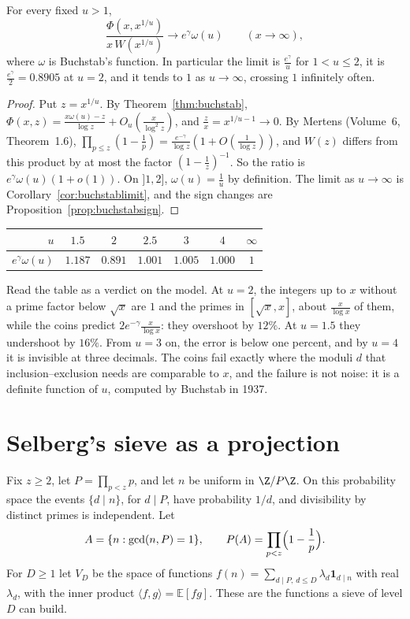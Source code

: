 \begin{proposition}\label{prop:sievefail}
For every fixed $u>1$,
\[
\frac{\Phi(x,x^{1/u})}{x\,W(x^{1/u})}\longrightarrow e^\gamma\omega(u)\qquad(x\to\infty),
\]
where $\omega$ is Buchstab's function. In particular the limit is $\frac{e^\gamma}u$ for $1<u\le2$, it is $\frac{e^\gamma}2=0.8905$ at $u=2$, and it tends to $1$ as $u\to\infty$, crossing $1$ infinitely often.
\end{proposition}
\begin{proof}
Put $z=x^{1/u}$. By Theorem~\ref{thm:buchstab}, $\Phi(x,z)=\frac{x\omega(u)-z}{\log z}+O_u(\frac x{\log^2z})$, and $\frac zx=x^{1/u-1}\to0$. By Mertens (Volume~6, Theorem~1.6), $\prod_{p\le z}(1-\frac1p)=\frac{e^{-\gamma}}{\log z}(1+O(\frac1{\log z}))$, and $W(z)$ differs from this product by at most the factor $(1-\frac1z)^{-1}$. So the ratio is $e^\gamma\omega(u)(1+o(1))$. On $]1,2]$, $\omega(u)=\frac1u$ by definition. The limit as $u\to\infty$ is Corollary~\ref{cor:buchstablimit}, and the sign changes are Proposition~\ref{prop:buchstabsign}.
\end{proof}

\begin{center}
\begin{tabular}{rcccccc}
$u$ & $1.5$ & $2$ & $2.5$ & $3$ & $4$ & $\infty$\\\hline
$e^\gamma\omega(u)$ & $1.187$ & $0.891$ & $1.001$ & $1.005$ & $1.000$ & $1$
\end{tabular}
\end{center}

Read the table as a verdict on the model. At $u=2$, the integers up to $x$ without a prime factor below $\sqrt x$ are $1$ and the primes in $[\sqrt x,x]$, about $\frac x{\log x}$ of them, while the coins predict $2e^{-\gamma}\frac x{\log x}$: they overshoot by $12\%$. At $u=1.5$ they undershoot by $16\%$. From $u=3$ on, the error is below one percent, and by $u=4$ it is invisible at three decimals. The coins fail exactly where the moduli $d$ that inclusion--exclusion needs are comparable to $x$, and the failure is not noise: it is a definite function of $u$, computed by Buchstab in 1937.



\section{Selberg's sieve as a projection}

Fix $z\ge2$, let $P=\prod_{p<z}p$, and let $n$ be uniform in $\Z/P\Z$. On this probability space the events $\{d\mid n\}$, for $d\mid P$, have probability $1/d$, and divisibility by distinct primes is independent. Let
\[
A=\{n:\gcd(n,P)=1\},\qquad P(A)=\prod_{p<z}\Bigl(1-\frac1p\Bigr).
\]
For $D\ge1$ let $V_D$ be the space of functions $f(n)=\sum_{d\mid P,\,d\le D}\lambda_d\mathbf 1_{d\mid n}$ with real $\lambda_d$, with the inner product $\langle f,g\rangle=\mathbb E[fg]$. These are the functions a sieve of level $D$ can build.

